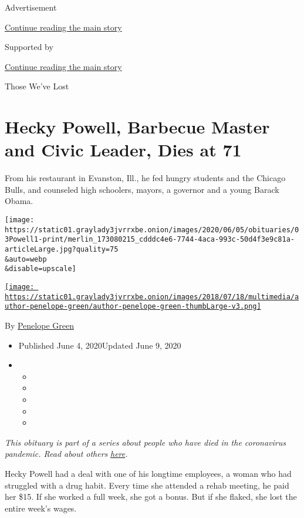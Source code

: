 Advertisement

\protect\hyperlink{after-top}{Continue reading the main story}

Supported by

\protect\hyperlink{after-sponsor}{Continue reading the main story}

Those We've Lost

\hypertarget{hecky-powell-barbecue-master-and-civic-leader-dies-at-71}{%
\section{Hecky Powell, Barbecue Master and Civic Leader, Dies at
71}\label{hecky-powell-barbecue-master-and-civic-leader-dies-at-71}}

From his restaurant in Evanston, Ill., he fed hungry students and the
Chicago Bulls, and counseled high schoolers, mayors, a governor and a
young Barack Obama.

\texttt{[image: https://static01.graylady3jvrrxbe.onion/images/2020/06/05/obituaries/03Powell1-print/merlin\_173080215\_cdddc4e6-7744-4aca-993c-50d4f3e9c81a-articleLarge.jpg?quality=75\\\&auto=webp\\\&disable=upscale]}

\href{https://www.nytimes3xbfgragh.onion/by/penelope-green}{\texttt{[image: https://static01.graylady3jvrrxbe.onion/images/2018/07/18/multimedia/author-penelope-green/author-penelope-green-thumbLarge-v3.png]}}

By \href{https://www.nytimes3xbfgragh.onion/by/penelope-green}{Penelope
Green}

\begin{itemize}
\item
  Published June 4, 2020Updated June 9, 2020
\item
  \begin{itemize}
  \item
  \item
  \item
  \item
  \item
  \end{itemize}
\end{itemize}

\emph{This obituary is part of a series about people who have died in
the coronavirus pandemic. Read about others}
\href{https://www.nytimes3xbfgragh.onion/series/people-who-have-died-of-the-coronavirus}{\emph{here}}\emph{.}

Hecky Powell had a deal with one of his longtime employees, a woman who
had struggled with a drug habit. Every time she attended a rehab
meeting, he paid her \$15. If she worked a full week, she got a bonus.
But if she flaked, she lost the entire week's wages.

